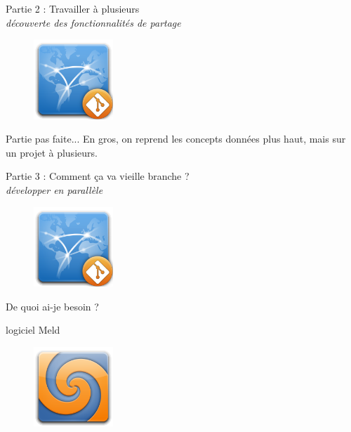 \documentclass{beamer}
\begin{document}
\begin{frame}
	\begin{center}
 		\Large{Partie 2 : Travailler à plusieurs}\\
 		{\small  \textit{découverte des fonctionnalités de partage}}
	\end{center}

	\begin{figure}
		\centering
		\includegraphics[height=3cm]{img/web}
	\end{figure}
\end{frame}

\begin{frame}
	Partie pas faite... En gros, on reprend les concepts données plus haut, mais sur un projet à plusieurs.
\end{frame}

\begin{frame}
	\begin{center}
 		\Large{Partie 3 : Comment ça va vieille branche ?}\\
 		{\small  \textit{développer en parallèle}}
	\end{center}

	\begin{figure}
		\centering
		\includegraphics[height=3cm]{img/web}
	\end{figure}
\end{frame}

\begin{frame}{De quoi ai-je besoin ?}
	\begin{center}
 		\Large{logiciel Meld}\\
	\end{center}

	\begin{figure}
		\centering
		\includegraphics[height=3cm]{img/meld}
	\end{figure}
\end{frame}
\end{document}
